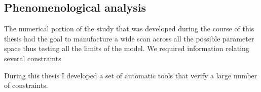 


\subsection{Phenomenological analysis}

The numerical portion of the study that was developed during the course of this thesis had the goal to manufacture a wide scan across all the possible parameter space thus testing all the limits of the model. We required information relating several constraints 

During this thesis I developed a set of automatic tools that verify a large number of constraints. 


 



